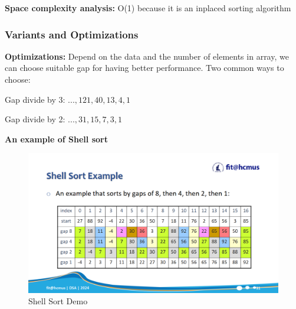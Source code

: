 \textbf{Space complexity analysis:} O(1) because it is an inplaced sorting algorithm

\vspace{10pt}

\subsubsection{Variants and Optimizations}
\textbf{Optimizations:} Depend on the data and the number of elements in array, we can choose suitable gap for having better performance. Two common ways to choose: 

\vspace{5pt}

Gap divide by 3: $..., 121, 40, 13, 4, 1$

\vspace{5pt}

Gap divide by 2: $..., 31, 15, 7, 3, 1$

\vspace{5pt}


\textbf{An example of Shell sort} ~\cite{ref1}

\begin{figure}[h]
    \centering
    \includegraphics[scale=.23]{Figures/sort_demo/shell.png}
    \caption{Shell Sort Demo}
    \label{fig:enter-label}
\end{figure}